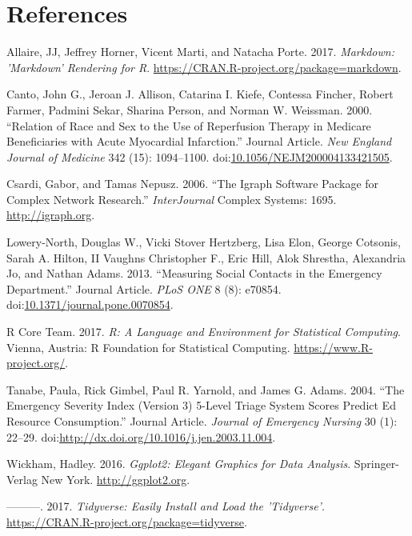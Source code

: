 \documentclass[]{elsarticle} %
\begin{document}
\section*{References}\label{references.unnumbered}

\hypertarget{refs}{}
\hypertarget{ref-MARKDOWN}{}
Allaire, JJ, Jeffrey Horner, Vicent Marti, and Natacha Porte. 2017.
\emph{Markdown: 'Markdown' Rendering for R}.
\url{https://CRAN.R-project.org/package=markdown}.

\hypertarget{ref-RN602}{}
Canto, John G., Jeroan J. Allison, Catarina I. Kiefe, Contessa Fincher,
Robert Farmer, Padmini Sekar, Sharina Person, and Norman W. Weissman.
2000. ``Relation of Race and Sex to the Use of Reperfusion Therapy in
Medicare Beneficiaries with Acute Myocardial Infarction.'' Journal
Article. \emph{New England Journal of Medicine} 342 (15): 1094--1100.
doi:\href{https://doi.org/10.1056/NEJM200004133421505}{10.1056/NEJM200004133421505}.

\hypertarget{ref-IGRAPH}{}
Csardi, Gabor, and Tamas Nepusz. 2006. ``The Igraph Software Package for
Complex Network Research.'' \emph{InterJournal} Complex Systems: 1695.
\url{http://igraph.org}.

\hypertarget{ref-RN1X}{}
Lowery-North, Douglas W., Vicki Stover Hertzberg, Lisa Elon, George
Cotsonis, Sarah A. Hilton, II Vaughns Christopher F., Eric Hill, Alok
Shrestha, Alexandria Jo, and Nathan Adams. 2013. ``Measuring Social
Contacts in the Emergency Department.'' Journal Article. \emph{PLoS ONE}
8 (8): e70854.
doi:\href{https://doi.org/10.1371/journal.pone.0070854}{10.1371/journal.pone.0070854}.

\hypertarget{ref-CRAN}{}
R Core Team. 2017. \emph{R: A Language and Environment for Statistical
Computing}. Vienna, Austria: R Foundation for Statistical Computing.
\url{https://www.R-project.org/}.

\hypertarget{ref-RN251}{}
Tanabe, Paula, Rick Gimbel, Paul R. Yarnold, and James G. Adams. 2004.
``The Emergency Severity Index (Version 3) 5-Level Triage System Scores
Predict Ed Resource Consumption.'' Journal Article. \emph{Journal of
Emergency Nursing} 30 (1): 22--29.
doi:\href{https://doi.org/http://dx.doi.org/10.1016/j.jen.2003.11.004}{http://dx.doi.org/10.1016/j.jen.2003.11.004}.

\hypertarget{ref-GGPLOT2}{}
Wickham, Hadley. 2016. \emph{Ggplot2: Elegant Graphics for Data
Analysis}. Springer-Verlag New York. \url{http://ggplot2.org}.

\hypertarget{ref-TIDY}{}
---------. 2017. \emph{Tidyverse: Easily Install and Load the
'Tidyverse'}. \url{https://CRAN.R-project.org/package=tidyverse}.
\end{document}
